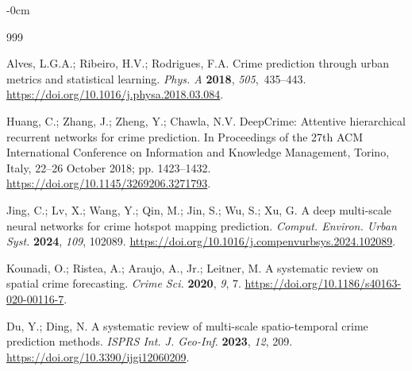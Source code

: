 \documentclass[applsci,article,accept,moreauthors]{Definitions/mdpi}
\def\colorbox#1#2{#2}%
\begin{document}
\begin{adjustwidth}{-\extralength}{0cm}
\reftitle{\colorbox{green}{References}}%

\begin{thebibliography}{999}

Alves, L.G.A.; Ribeiro, H.V.; Rodrigues, F.A. Crime prediction through
urban metrics and statistical learning. \emph{Phys. A} \textbf{2018},
\emph{505},~435--443.
\url{https://doi.org/10.1016/j.physa.2018.03.084}.


Huang, C.; Zhang, J.; Zheng, Y.; Chawla, N.V. DeepCrime: Attentive
hierarchical recurrent networks for crime prediction. In
{Proceedings of the 27th ACM International Conference on Information
and Knowledge Management}, Torino, Italy, 22--26 October 2018;
pp. 1423--1432. \url{https://doi.org/10.1145/3269206.3271793}.

Jing, C.; Lv, X.; Wang, Y.; Qin, M.; Jin, S.; Wu, S.; Xu, G. A deep multi-scale neural networks for crime hotspot mapping prediction. \emph{Comput. Environ. Urban Syst.} \textbf{2024}, \emph{109}, 102089. \url{https://doi.org/10.1016/j.compenvurbsys.2024.102089}.

Kounadi, O.; Ristea, A.; Araujo, A., Jr.; Leitner, M. A systematic review
on spatial crime forecasting. \emph{Crime Sci.} \textbf{2020}, \emph{9}, 7.
\url{https://doi.org/10.1186/s40163-020-00116-7}.

Du, Y.; Ding, N. A systematic review of multi-scale spatio-temporal crime prediction methods. \emph{ISPRS Int. J. Geo-Inf.} \textbf{2023}, \emph{12}, 209. \url{https://doi.org/10.3390/ijgi12060209}.


\end{thebibliography}
\end{adjustwidth}
\end{document}
